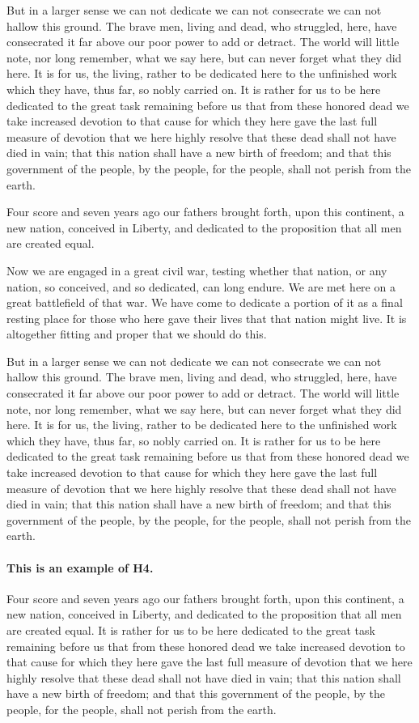 \documentclass{roffin}
\begin{document}
But in a larger sense we can not dedicate we can not consecrate we can not hallow this ground. The brave men, living and dead,
who struggled, here, have consecrated it far above our poor power to add or detract. The world will little note, nor long remember,
what we say here, but can never forget what they did here. It is for us, the living, rather to be dedicated here to the unfinished work
which they have, thus far, so nobly carried on. It is rather for us to be here dedicated to the great task remaining before us that
from these honored dead we take increased devotion to that cause for which they here gave the last full measure of devotion that
we here highly resolve that these dead shall not have died in vain; that this nation shall have a new birth of freedom; and that this
government of the people, by the people, for the people, shall not perish from the earth.

Four score and seven years ago our fathers brought forth,
upon this continent, a new nation, conceived in Liberty, and dedicated to
the proposition that all men are created equal.
\begin{extract}Now we are engaged in a great civil war, testing whether that nation, or any nation, so conceived, and so dedicated, can long endure.
We are met here on a great battlefield of that war. We have come to dedicate a portion of it as a final resting place for those who
here gave their lives that that nation might live. It is altogether fitting and proper that we should do this.
\end{extract}
But in a larger sense we can not dedicate we can not consecrate we can not hallow this ground. The brave men, living and dead,
who struggled, here, have consecrated it far above our poor power to add or detract. The world will little note, nor long remember,
what we say here, but can never forget what they did here. It is for us, the living, rather to be dedicated here to the unfinished work
which they have, thus far, so nobly carried on. It is rather for us to be here dedicated to the great task remaining before us that
from these honored dead we take increased devotion to that cause for which they here gave the last full measure of devotion that
we here highly resolve that these dead shall not have died in vain; that this nation shall have a new birth of freedom; and that this
government of the people, by the people, for the people, shall not perish from the earth.

\paragraph{This is an example of H4.}
Four score and seven years ago our fathers brought forth,
upon this continent, a new nation, conceived in Liberty, and dedicated to
the proposition that all men are created equal. It is rather for us to be here dedicated to the great task remaining before us that
from these honored dead we take increased devotion to that cause for which they here gave the last full measure of devotion that
we here highly resolve that these dead shall not have died in vain; that this nation shall have a new birth of freedom; and that this
government of the people, by the people, for the people, shall not perish from the earth.
\end{document}
